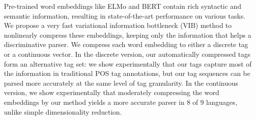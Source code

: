 Pre-trained word embeddings like ELMo and BERT contain rich syntactic and semantic information, resulting in state-of-the-art performance on various tasks.  We propose a very fast variational information bottleneck (VIB) method to nonlinearly compress these embeddings, keeping only the information that helps a discriminative parser. We compress each word embedding to either a discrete tag or a continuous vector. In the discrete version, our automatically compressed tags form an alternative tag set: we show experimentally that our tags capture most of the information in traditional POS tag annotations, but our tag sequences can be parsed more accurately at the same level of tag granularity. In the continuous version, we show experimentally that moderately compressing the word embeddings by our method yields a more accurate parser in 8 of 9 languages, unlike simple dimensionality reduction.